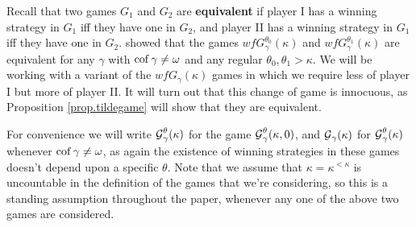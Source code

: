 \documentclass[../../main]{subfiles}
\begin{document}
Recall that two games $G_1$ and $G_2$ are \textbf{equivalent} if player I has a winning strategy in $G_1$ iff they have one in $G_2$, and player II has a winning strategy in $G_1$ iff they have one in $G_2$. \cite{HolySchlicht} showed that the games $wfG_\gamma^{\theta_0}(\kappa)$ and $wfG_\gamma^{\theta_1}(\kappa)$ are equivalent for any $\gamma$ with $\operatorname{cof}\gamma\neq\omega$ and any regular $\theta_0,\theta_1>\kappa$. We will be working with a variant of the $wfG_\gamma(\kappa)$ games in which we require less of player I but more of player II. It will turn out that this change of game is innocuous, as Proposition \ref{prop.tildegame} will show that they are equivalent.


For convenience we will write $\operatorname{\mathcal G}_\gamma^\theta(\kappa)$ for the game $\operatorname{\mathcal G}_\gamma^\theta(\kappa,0)$, and $\operatorname{\mathcal G}_\gamma(\kappa)$ for $\operatorname{\mathcal G}_\gamma^\theta(\kappa)$ whenever $\operatorname{cof}\gamma\neq\omega$, as again the existence of winning strategies in these games doesn't depend upon a specific $\theta$. Note that we assume that $\kappa=\kappa^{<\kappa}$ is uncountable in the definition of the games that we're considering, so this is a standing assumption throughout the paper, whenever any one of the above two games are considered.

\end{document}
